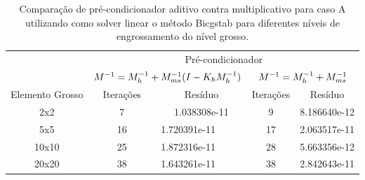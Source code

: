 \begin{table}[]\label{table:precondcasoAcomp}
    \caption{Comparação de pré-condicionador aditivo contra multiplicativo para caso A utilizando como solver linear o método Bicgstab para diferentes níveis de engrossamento do nível grosso.}
    \begin{tabular}{c|c|l|c|l|}

    \cline{2-5}
                                          & \multicolumn{4}{c|}{Pré-condicionador}                                                        \\ \cline{2-5} 
                                          & \multicolumn{2}{c|}{$M^{-1}=M^{-1}_{h} + M^{-1}_{ms}(I-K_hM^{-1}_{h})$}               & \multicolumn{2}{c|}{$M^{-1}=M^{-1}_{h} + M^{-1}_{ms}$}                \\ \hline
    \multicolumn{1}{|c|}{Elemento Grosso} & Iterações & \multicolumn{1}{c|}{Resíduo}      & Iterações & \multicolumn{1}{c|}{Resíduo}      \\ \hline
    \multicolumn{1}{|c|}{2x2}             & 7         & \multicolumn{1}{c|}{1.038308e-11} & 9         & \multicolumn{1}{c|}{8.186640e-12} \\ \hline
    \multicolumn{1}{|c|}{5x5}             & 16        & 1.720391e-11                      & 17        & 2.063517e-11                      \\ \hline
    \multicolumn{1}{|c|}{10x10}           & 25        & 1.872316e-11                      & 28        & 5.663356e-12                      \\ \hline
    \multicolumn{1}{|c|}{20x20}           & 38        & 1.643261e-11                      & 38        & 2.842643e-11                      \\ \hline
    \end{tabular}
\end{table}


